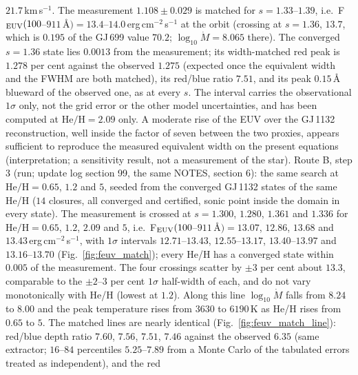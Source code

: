 \documentclass[english,a4paper]{my_memo}
\begin{document}
\begin{enumerate}
      $21.7$\,km\,s$^{-1}$. The measurement $1.108 \pm 0.029$ is matched
      for $s = 1.33$--$1.39$, i.e.\ F$_{\rm EUV}(100$--$911$\,\AA$) =
      13.4$--$14.0$\,erg\,cm$^{-2}$\,s$^{-1}$ at the orbit (crossing at
      $s = 1.36$, $13.7$, which is $0.195$ of the GJ\,699 value $70.2$;
      $\log_{10}\dot M = 8.065$ there). The converged $s = 1.36$ state
      lies $0.0013$ from the measurement; its width-matched red peak is
      $1.278$ per cent against the observed $1.275$ (expected once the
      equivalent width and the FWHM are both matched), its red/blue ratio
      $7.51$, and its peak $0.15$\,\AA{} blueward of the observed one, as
      at every $s$. The interval carries the observational $1\sigma$ only,
      not the grid error or the other model uncertainties, and has been
      computed at $\mathrm{He/H} = 2.09$ only. A moderate rise of the EUV
      over the GJ\,1132 reconstruction, well inside the factor of seven
      between the two proxies, appears sufficient to reproduce the
      measured equivalent width on the present equations (interpretation;
      a sensitivity result, not a measurement of the star).
      Route B, step 3 (run; update log section 99, the same NOTES,
      section 6): the same search at $\mathrm{He/H} = 0.65$, $1.2$ and
      $5$, seeded from the converged GJ\,1132 states of the same He/H
      ($14$ closures, all converged and certified, sonic point inside the
      domain in every state). The measurement is crossed at $s = 1.300$,
      $1.280$, $1.361$ and $1.336$ for $\mathrm{He/H} = 0.65$, $1.2$,
      $2.09$ and $5$, i.e.\ F$_{\rm EUV}(100$--$911$\,\AA$) = 13.07$,
      $12.86$, $13.68$ and $13.43$\,erg\,cm$^{-2}$\,s$^{-1}$, with
      $1\sigma$ intervals $12.71$--$13.43$, $12.55$--$13.17$,
      $13.40$--$13.97$ and $13.16$--$13.70$
      (Fig.~\ref{fig:feuv_match}); every He/H has a converged state within
      $0.005$ of the measurement. The four crossings scatter by
      $\pm3$ per cent about $13.3$, comparable to the $\pm2$--$3$ per cent
      $1\sigma$ half-width of each, and do not vary monotonically with
      He/H (lowest at $1.2$). Along this line $\log_{10}\dot M$ falls from
      $8.24$ to $8.00$ and the peak temperature rises from $3630$ to
      $6190$\,K as He/H rises from $0.65$ to $5$. The matched lines are
      nearly identical (Fig.~\ref{fig:feuv_match_line}): red/blue depth
      ratio $7.60$, $7.56$, $7.51$, $7.46$ against the observed $6.35$
      (same extractor; $16$--$84$ percentiles $5.25$--$7.89$ from a Monte
      Carlo of the tabulated errors treated as independent), and the red

\end{enumerate}
\end{document}
